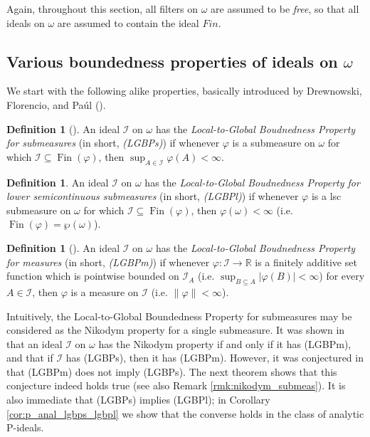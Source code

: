 \documentclass[a4paper,11pt,fleqn]{amsart}
\theoremstyle{definition}
\newtheorem{definition}[theorem]{Definition}
\theoremstyle{remark}
\numberwithin{equation}{section}
\newcommand{\N}{\mathbb{N}}
\newcommand{\R}{\mathbb{R}}
\newcommand{\iI}{\mathcal{I}}
\DeclareMathOperator{\fin}{Fin}
\newcommand{\sub}{\subseteq}
\newcommand{\wo}{{\wp(\omega)}}%
\begin{document}
\medskip

Again, throughout this section, all filters on $\omega$ are assumed to be \textit{free}, so that all ideals on $\omega$ are assumed to contain the ideal $Fin$.

\subsection{Various boundedness properties of ideals on $\omega$}

We start with the following alike properties, basically introduced by Drewnowski, Florencio, and Pa\'ul  (\cite[Section 2]{DFP96}).

\begin{definition}[{\cite{DFP96}}]\label{def:lgbps}
    An ideal $\iI$ on $\omega$ has the \textit{Local-to-Global Boudnedness Property for submeasures} (in short, \textit{(LGBPs)}) if whenever $\varphi$ is a submeasure on $\omega$ for which  $\iI\sub\fin(\varphi)$, then $\sup_{A\in\iI}\varphi(A)<\infty$.
\end{definition}

\begin{definition}\label{def:lgbpl}
    An ideal $\iI$ on $\omega$ has the \textit{Local-to-Global Boudnedness Property for lower semicontinuous submeasures} (in short, \textit{(LGBPl)}) if whenever $\varphi$ is a lsc submeasure on $\omega$ for which  $\iI\sub\fin(\varphi)$, then $\varphi(\omega)<\infty$ (i.e. $\fin(\varphi)=\wo$).%
\end{definition}

\begin{definition}[{\cite{DFP96}}]\label{def:lgbpm}
An ideal $\iI$ on $\omega$ has the \textit{Local-to-Global Boudnedness Property for measures} (in short, \textit{(LGBPm)}) if whenever $\varphi\colon\iI\to\R$ is a finitely additive set function which is pointwise bounded on $\iI_A$ (i.e. $\sup_{B\sub A}|\varphi(B)|<\infty$) for every $A\in\iI$, then $\varphi$ is a measure on $\iI$ (i.e. $\|\varphi\|<\infty$). 
\end{definition}

Intuitively, the Local-to-Global Boundedness Property for submeasures may be considered as the Nikodym property for a single submeasure. It was shown in \cite{DFP96} that an ideal $\iI$ on $\omega$ has the Nikodym property if and only if it has (LGBPm), and that if $\iI$ has (LGBPs), then it has (LGBPm). However, it was conjectured in \cite[Conjecture, page 147]{DFP96} that (LGBPm) does not imply (LGBPs). The next theorem shows that this conjecture indeed holds true (see also Remark \ref{rmk:nikodym_submeas}). It is also immediate that (LGBPs) implies (LGBPl); in Corollary \ref{cor:p_anal_lgbps_lgbpl} we show that the converse holds in the class of analytic P-ideals.
\end{document}
